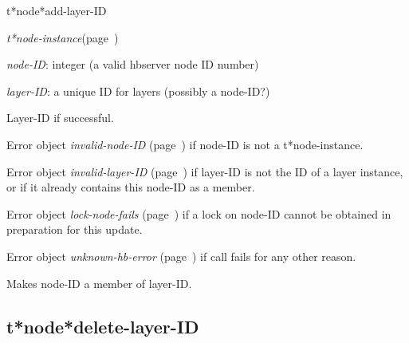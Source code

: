 \begin{description}
\item [Name:]  t*node*add-layer-ID

\item [Class:] {\sl t*node-instance}\hfill(page~\pageref{t*node-instance})

\item [Parameters:]
\item {\sl node-ID}:  
integer (a valid hbserver node ID number)

\item {\sl layer-ID}:  a unique ID for layers (possibly a node-ID?)



\item [Return-value:]
Layer-ID if successful.

Error object {\sl invalid-node-ID} (page~\pageref{invalid-node-ID}) if node-ID is not
a t*node-instance.

Error object {\sl invalid-layer-ID} (page~\pageref{invalid-layer-ID}) if layer-ID is
not the ID of a layer instance, or if it already
contains this node-ID as a member.

Error object {\sl lock-node-fails} (page~\pageref{lock-node-fails}) if a lock on
node-ID cannot be obtained in preparation for this
update.

Error object {\sl unknown-hb-error} (page~\pageref{unknown-hb-error}) if call fails
for any other reason.

\item [Description:]

Makes node-ID a member of layer-ID.

\item [Public:]



\end{description}
\horizontalline

\subsection{t*node*delete-layer-ID}
\label{t*node*delete-layer-ID}

